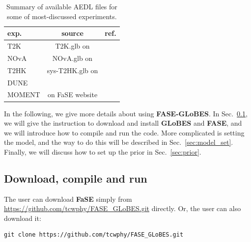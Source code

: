 \documentclass[aps,prd,nofootinbib,preprint]{revtex4}
\begin{document}
\begin{table}[h!]
\caption{\label{tab:exp}Summary of available AEDL files for some of most-discussed experiments.}
\centering
\begin{tabular}{l|c|r}
exp.   & source & ref. \\\hline\hline
T2K    &     T2K.glb on \cite{GLoBES}  &    \cite{Huber:2002mx}  \\
NOvA   &     NOvA.glb on \cite{GLoBES}   &   \cite{Ambats:2004js}   \\
T2HK   & sys-T2HK.glb on \cite{GLoBES}  &   \cite{Huber:2007xx}   \\
DUNE   &    \cite{Alion:2016uaj}    &  \cite{Alion:2016uaj}    \\
MOMENT &   on FaSE website    &     \cite{Cao:2014bea}
\end{tabular}
\end{table}

In the following, we give more details about using \textbf{FASE-GLoBES}. In Sec.~\ref{sec:compile}, we will give the instruction to download and install \textbf{GLoBES} and \textbf{FASE}, and we will introduce how to compile and run the code. More complicated is setting the model, and the way to do this will be described in Sec.~\ref{sec:model_set}. Finally, we will discuss how to set up the prior in Sec.~\ref{sec:prior}.

\subsection{Download, compile and run}\label{sec:compile}
{\color{blue}

The user can download \textbf{FaSE} simply from \url{https://github.com/tcwphy/FASE_GLoBES.git} directly. Or, the user can also download it: 
\begin{verbatim}
git clone https://github.com/tcwphy/FASE_GLoBES.git
\end{verbatim}
}
\end{document}
